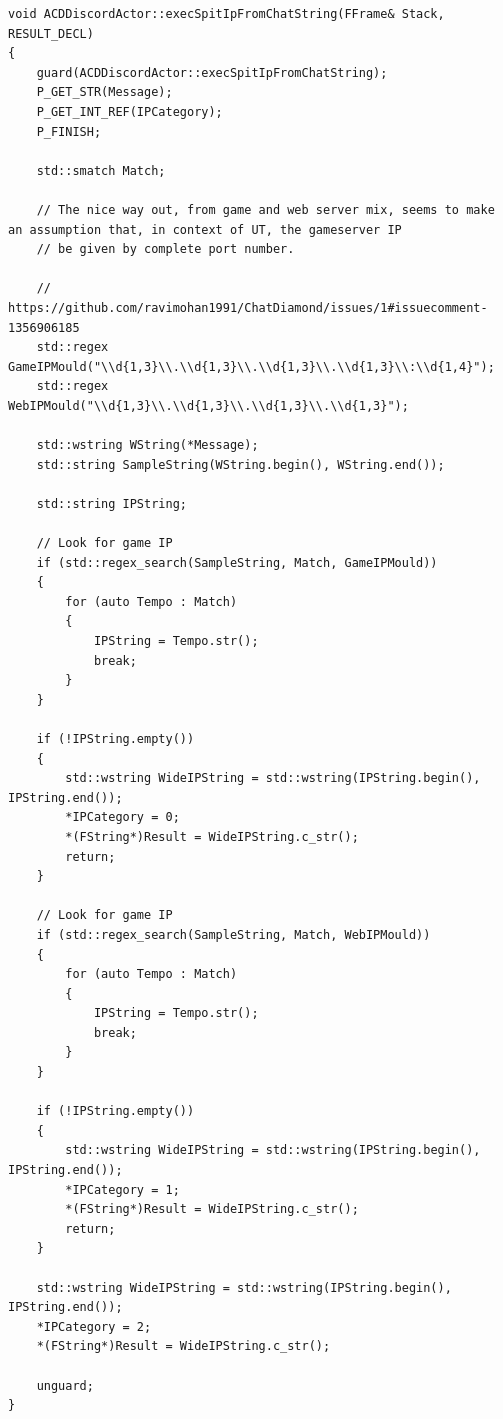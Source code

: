\documentclass{article}
\theoremstyle{definition}
\begin{document}
\lstset{language=C++}
\begin{lstlisting}[frame=single]
void ACDDiscordActor::execSpitIpFromChatString(FFrame& Stack, RESULT_DECL)
{
	guard(ACDDiscordActor::execSpitIpFromChatString);
	P_GET_STR(Message);
	P_GET_INT_REF(IPCategory);
	P_FINISH;

	std::smatch Match;

	// The nice way out, from game and web server mix, seems to make an assumption that, in context of UT, the gameserver IP
	// be given by complete port number.

	// https://github.com/ravimohan1991/ChatDiamond/issues/1#issuecomment-1356906185
	std::regex GameIPMould("\\d{1,3}\\.\\d{1,3}\\.\\d{1,3}\\.\\d{1,3}\\:\\d{1,4}");
	std::regex WebIPMould("\\d{1,3}\\.\\d{1,3}\\.\\d{1,3}\\.\\d{1,3}");

	std::wstring WString(*Message);
	std::string SampleString(WString.begin(), WString.end());

	std::string IPString;

	// Look for game IP
	if (std::regex_search(SampleString, Match, GameIPMould))
	{
		for (auto Tempo : Match)
		{
			IPString = Tempo.str();
			break;
		}
	}

	if (!IPString.empty())
	{
		std::wstring WideIPString = std::wstring(IPString.begin(), IPString.end());
		*IPCategory = 0;
		*(FString*)Result = WideIPString.c_str();
		return;
	}

	// Look for game IP
	if (std::regex_search(SampleString, Match, WebIPMould))
	{
		for (auto Tempo : Match)
		{
			IPString = Tempo.str();
			break;
		}
	}

	if (!IPString.empty())
	{
		std::wstring WideIPString = std::wstring(IPString.begin(), IPString.end());
		*IPCategory = 1;
		*(FString*)Result = WideIPString.c_str();
		return;
	}

	std::wstring WideIPString = std::wstring(IPString.begin(), IPString.end());
	*IPCategory = 2;
	*(FString*)Result = WideIPString.c_str();

	unguard;
}
\end{lstlisting}
\end{document}

